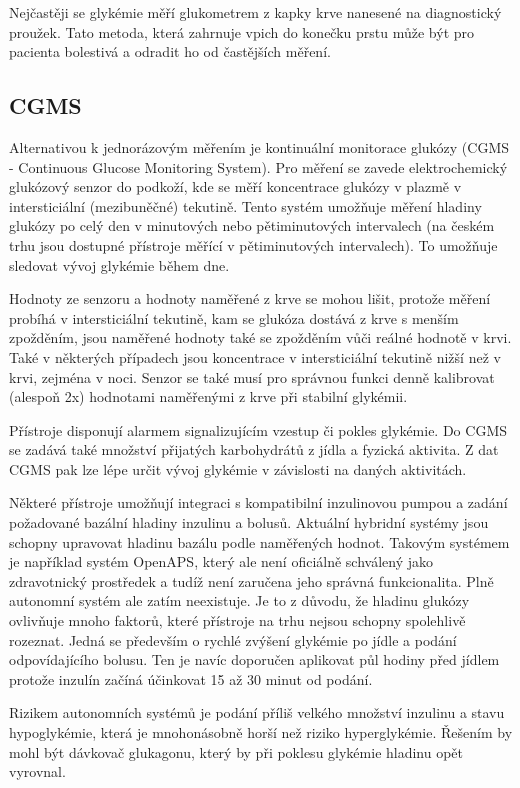Nejčastěji se glykémie měří glukometrem z kapky krve nanesené na diagnostický proužek. Tato metoda, která zahrnuje vpich do konečku prstu může být pro pacienta bolestivá a odradit ho od častějších měření. \cite{Diabetes.Pelikan}

\subsection{CGMS}

Alternativou k jednorázovým měřením je kontinuální monitorace glukózy (CGMS - Continuous Glucose Monitoring System). Pro měření se zavede elektrochemický glukózový senzor do podkoží, kde se měří koncentrace glukózy v plazmě v intersticiální (mezibuněčné) tekutině. Tento systém umožňuje měření hladiny glukózy po celý den v minutových nebo pětiminutových intervalech (na českém trhu jsou dostupné přístroje měřící v pětiminutových intervalech). To umožňuje sledovat vývoj glykémie během dne.

Hodnoty ze senzoru a hodnoty naměřené z krve se mohou lišit, protože měření probíhá v intersticiální tekutině, kam se glukóza dostává z krve s menším zpožděním, jsou naměřené hodnoty také se zpožděním vůči reálné hodnotě v krvi. Také v některých případech jsou koncentrace v intersticiální tekutině nižší než v krvi, zejména v noci. Senzor se také musí pro správnou funkci denně kalibrovat (alespoň 2x) hodnotami naměřenými z krve při stabilní glykémii. \citep{Diabetes.Perusicova}

Přístroje disponují alarmem signalizujícím vzestup či pokles glykémie. Do CGMS se zadává také množství přijatých karbohydrátů z jídla a fyzická aktivita. Z dat CGMS pak lze lépe určit vývoj glykémie v závislosti na daných aktivitách.

Některé přístroje umožňují integraci s kompatibilní inzulinovou pumpou a zadání požadované bazální hladiny inzulinu a bolusů. Aktuální hybridní systémy jsou schopny upravovat hladinu bazálu podle naměřených hodnot. Takovým systémem je například systém OpenAPS, který ale není oficiálně schválený jako zdravotnický prostředek a tudíž není zaručena jeho správná funkcionalita. Plně autonomní systém ale zatím neexistuje. Je to z důvodu, že hladinu glukózy ovlivňuje mnoho faktorů, které přístroje na trhu nejsou schopny spolehlivě rozeznat. Jedná se především o rychlé zvýšení glykémie po jídle a podání odpovídajícího bolusu. Ten je navíc doporučen aplikovat půl hodiny před jídlem protože inzulín začíná účinkovat 15 až 30 minut od podání.

Rizikem autonomních systémů je podání příliš velkého množství inzulinu a stavu hypoglykémie, která je mnohonásobně horší než riziko hyperglykémie. Řešením by mohl být dávkovač glukagonu, který by při poklesu glykémie hladinu opět vyrovnal. \citep{cukrovka.cz}
